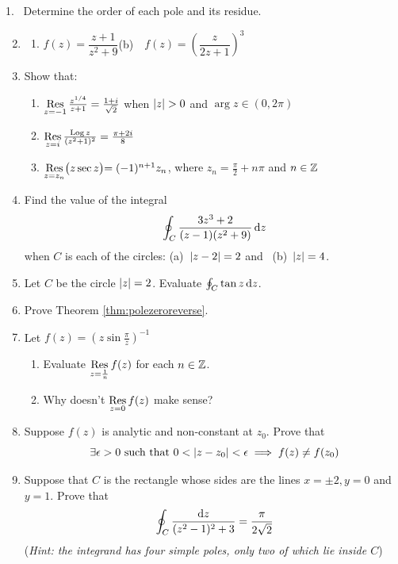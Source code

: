 \begin{exercises*}
\hangindent\leftmargini
\textup{1.} \ Determine the order of each pole and its residue.
\begin{enumerate}\setcounter{enumi}{1}
  \item[]\begin{enumerate}
    \item $f(z)=\dfrac{z+1}{z^2+9}$\qquad (b)\ \ $f(z)=\left(\dfrac{z}{2z+1}\right)^3$
  \end{enumerate}
  
  \item Show that:
  \begin{enumerate}
    \item $\operatorname*{Res}\limits_{z=-1}\frac{z^{1/4}}{z+1}=\frac{1+i}{\sqrt 2}$ when $\nm z>0$ and $\arg z\in(0,2\pi)$
    
    \item $\operatorname*{Res}\limits_{z=i}\frac{\operatorname{Log} z}{(z^2+1)^2}=\frac{\pi+2i}8$
    
    \item $\operatorname*{Res}\limits_{z=z_n}\bigl(z\sec z\bigl)=(-1)^{n+1}z_n$, where $z_n=\frac\pi 2+n\pi$ and $n\in\mathbb{Z}$
  \end{enumerate}
  
  \item Find the value of the integral
  \[\oint_C\frac{3z^3+2}{(z-1)(z^2+9)}\,{\mathrm{d} z}\]
 	when $C$ is each of the circles: (a)\ $\left| z-2\right|=2$ and \ (b)\ $\left| z\right|=4$.
  
  \item Let $C$ be the circle $\left| z\right|=2$. Evaluate $\oint_C\tan z\,{\mathrm{d} z}$.
  
  \item Prove Theorem \ref{thm:polezeroreverse}.
  
  \item Let $f(z)=\left(z\sin\frac\pi z\right)^{-1}$
  \begin{enumerate}
    \item Evaluate $\operatorname*{Res}\limits_{z=\frac 1n}f(z)$ for each $n\in\mathbb{Z}$.
    \item Why doesn't $\operatorname*{Res}\limits_{z=0}f(z)$ make sense?
  \end{enumerate}
  
	\item Suppose $f(z)$ is analytic and non-constant at $z_0$. Prove that
	\[\exists\epsilon>0\ \text{such that}\ 0<\left| z-z_0\right|<\epsilon\implies f(z)\neq f(z_0)\]  

  
  \item Suppose that $C$ is the rectangle whose sides are the lines $x=\pm 2, y=0$ and $y=1$. Prove that
  \[\oint_C\frac{{\mathrm{d} z}}{(z^2-1)^2+3}=\frac\pi{2\sqrt 2}\]
  (\emph{Hint: the integrand has four simple poles, only two of which lie inside $C$})
  

\end{enumerate}
\end{exercises*}
